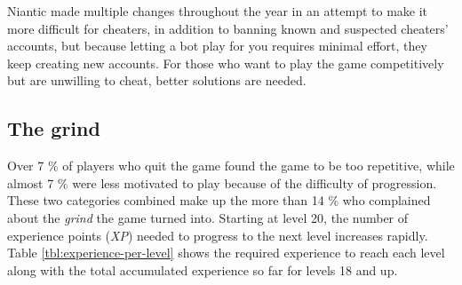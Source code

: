 Niantic made multiple changes throughout the year in an attempt to make it more difficult for cheaters, in addition to banning known and suspected cheaters' accounts, but because letting a bot play for you requires minimal effort, they keep creating new accounts. For those who want to play the game competitively but are unwilling to cheat, better solutions are needed. 

\subsection{The grind}
\label{sec:quitting-reasons-the-grind}
Over 7 \% of players who quit the game found the game to be too repetitive, while almost 7 \% were less motivated to play because of the difficulty of progression. These two categories combined make up the more than 14 \% who complained about the \emph{grind}  the game turned into. Starting at level 20, the number of experience points (\emph{XP}) needed to progress to the next level increases rapidly. Table \ref{tbl:experience-per-level} shows the required experience to reach each level along with the total accumulated experience so far for levels 18 and up. 


